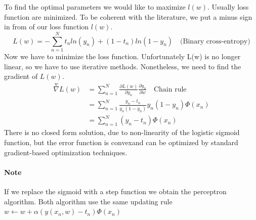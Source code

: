 \documentclass[main.tex]{subfiles}
\begin{document}
To find the optimal parameters we would like to maximize $l(w)$. Usually loss function are minimized. To be coherent with the literature, we put a minus sign in from of our loss function $l(w)$.
\begin{equation}
    L(w) = -\sum_{n=1}^N t_n ln(y_n) + (1 - t_n)ln(1 - y_n) \quad \text{(Binary cross-entropy)}
\end{equation}
Now we have to minimize the loss function. Unfortunately L(w) is no longer linear, so we have to use iterative methods. Nonetheless, we need to find the gradient of $L(w)$.
\begin{align*}
    \overset{w}{\nabla} L(w) &= \sum_{n=1}^N \frac{\partial L(w)}{\partial y_n} \frac{\partial y_n}{\partial w} \quad \text{Chain rule} \\
    &= \sum_{n=1}^N \frac{y_n - t_n}{y_n (1 - y_n)} y_n(1-y_n)\Phi(x_n) \\
    &= \sum_{n=1}^N (y_n - t_n)\Phi(x_n)
\end{align*}
There is no closed form solution, due to non-linearity of the logistic sigmoid function, but the error function is convex\footnotemark and can be optimized by standard gradient-based optimization techniques. 

\paragraph{Note} If we replace the sigmoid with a step function we obtain the perceptron algorithm. Both algorithm use the same updating rule $w \leftarrow w + \alpha(y(x_n, w)-t_n)\Phi(x_n)$
\end{document}
